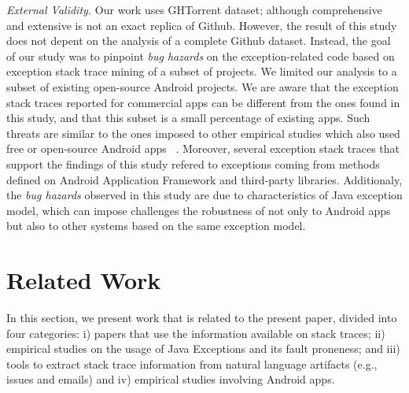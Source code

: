 \documentclass[conference]{IEEEtran}
\begin{document}
\emph{External Validity.} Our work uses GHTorrent dataset; although 
comprehensive and extensive is not an exact replica of Github. 
However, the result of this study does not depent on the analysis of
a complete Github dataset. Instead, the goal of our study was to 
pinpoint \emph{bug hazards} on the exception-related code based on 
exception stack trace mining of a subset of projects.
We limited our analysis to a subset of existing open-source Android projects.
We are aware that the exception stack traces reported 
for commercial apps can be different from the ones found in this study, and that
this subset is a small percentage of existing apps.
Such threats are similar to the ones imposed to other empirical studies 
which also used free or open-source Android apps ~\cite{Linar13,McDon13,ahimed}.
Moreover, several exception stack traces that support the findings of this study
refered to exceptions coming from methods defined on Android Application Framework
and third-party libraries.  Additionaly,  the \emph{bug hazards} observed in this study are due to
characteristics of Java exception model, which can impose challenges 
the robustness of not only to Android apps but also to other systems
 based on the same exception model. 


\section{Related Work}
\label{sec:rele}

In this section, we present work that is related to the present paper, divided into
four categories: i) papers that use the information available on stack traces;
ii) empirical studies on the usage of Java Exceptions and its fault proneness;
and iii) tools to extract stack trace information from natural language artifacts
(e.g., issues and emails) and iv) empirical studies involving Android apps.
\end{document}
